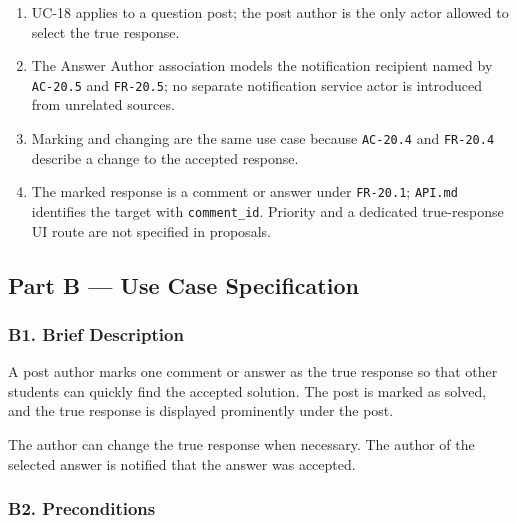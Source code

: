 \documentclass[12pt]{article}
\begin{document}
\begin{enumerate}
\item UC-18 applies to a question post; the post author is the only actor allowed to select the true response.
\item The Answer Author association models the notification recipient named by \texttt{AC-20.5} and \texttt{FR-20.5}; no separate notification service actor is introduced from unrelated sources.
\item Marking and changing are the same use case because \texttt{AC-20.4} and \texttt{FR-20.4} describe a change to the accepted response.
\item The marked response is a comment or answer under \texttt{FR-20.1}; \texttt{API.md} identifies the target with \texttt{comment\_id}. Priority and a dedicated true-response UI route are not specified in proposals.
\end{enumerate}
\par\medskip

\hypertarget{sec:part-b-use-case-specification}{}
\subsection*{Part B --- Use Case Specification}
\par\medskip

\hypertarget{sec:b1-brief-description}{}
\subsubsection*{B1. Brief Description}
\par\medskip

A post author marks one comment or answer as the true response so that other students can quickly find the accepted solution. The post is marked as solved, and the true response is displayed prominently under the post.
\par\medskip

The author can change the true response when necessary. The author of the selected answer is notified that the answer was accepted.
\par\medskip

\hypertarget{sec:b2-preconditions}{}
\subsubsection*{B2. Preconditions}
\par\medskip
\end{document}
